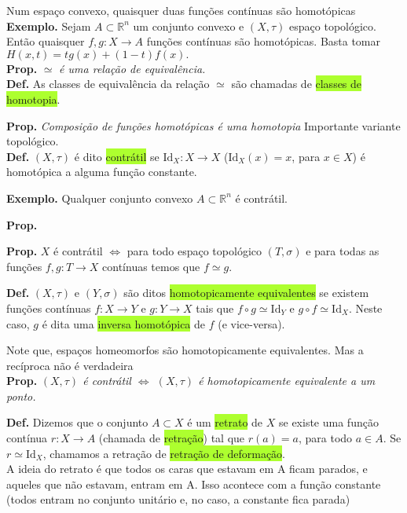 \documentclass{article}
\begin{document}
\begin{landscape}
\begin{multicols}{3}
\color{Emerald} Num espaço convexo, quaisquer duas funções contínuas são homotópicas\color{black}\\
\textbf{Exemplo.} Sejam \( A \subset \mathbb{R}^n \) um conjunto convexo e \( (X, \tau) \) espaço topológico. Então quaisquer \( f, g : X \to A \) funções contínuas são homotópicas. Basta tomar 
$H(x,t) = t g(x) + (1 - t) f(x).$\\

\textbf{Prop.} \( \simeq \) \textit{é uma relação de equivalência.}\\

\textbf{Def.} As classes de equivalência da relação \( \simeq \) são chamadas de \colorbox{GreenYellow}{classes de homotopia}.

\textbf{Prop.} \textit{Composição de funções homotópicas é uma homotopia}\medskip
\color{Emerald}Importante variante topológico.\color{black}\\
\textbf{Def.} \( (X, \tau) \) é dito \colorbox{GreenYellow}{contrátil} se \( \mathrm{Id}_X : X \to X \) (\( \mathrm{Id}_X(x) = x \), para \( x \in X \)) é homotópica a alguma função constante.\medskip

\textbf{Exemplo.} Qualquer conjunto convexo \( A \subset \mathbb{R}^n \) é contrátil.\medskip

\textbf{Prop. } \medskip

\textbf{Prop. } $X$ é contrátil $\Leftrightarrow$ para todo espaço topológico $(T, \sigma)$ e para todas as funções $f,g:T\to X$ contínuas temos que $f\simeq g$.\medskip

\textbf{Def.} \( (X, \tau) \) e \( (Y, \sigma) \) são ditos \colorbox{GreenYellow}{homotopicamente equivalentes} se existem funções contínuas \( f : X \to Y \) e \( g : Y \to X \) tais que \( f \circ g \simeq \mathrm{Id}_Y \) e \( g \circ f \simeq \mathrm{Id}_X \). Neste caso, \( g \) é dita uma \colorbox{GreenYellow}{inversa homotópica} de \( f \) (e vice-versa).\medskip

\color{Emerald}Note que, espaços homeomorfos são homotopicamente equivalentes. Mas a recíproca não é verdadeira\color{black}\\
\textbf{Prop.} \textit{\( (X, \tau) \) é contrátil $\Leftrightarrow$ \( (X, \tau) \) é homotopicamente equivalente a um ponto.}\medskip


\textbf{Def.} Dizemos que o conjunto \( A \subset X \) é um \colorbox{GreenYellow}{retrato} de \( X \) se existe uma função contínua \( r : X \to A \) (chamada de \colorbox{GreenYellow}{retração}) tal que \( r(a) = a \), para todo \( a \in A \). Se \( r \simeq \mathrm{Id}_X \), chamamos a retração de \colorbox{GreenYellow}{retração de deformação}.\\
\color{gray}A ideia do retrato é que todos os caras que estavam em A ficam parados, e aqueles que não estavam, entram em A. Isso acontece com a função constante (todos entram no conjunto unitário e, no caso, a constante fica parada)\color{black}


\end{multicols}
\end{landscape}
\end{document}
